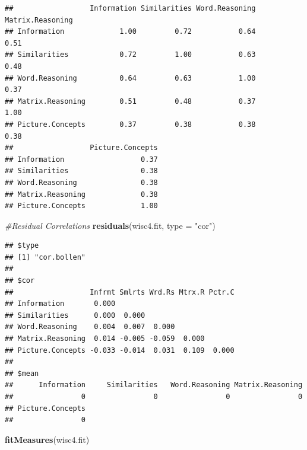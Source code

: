 \documentclass[]{book}
\newenvironment{Shaded}{\begin{snugshade}}{\end{snugshade}}
\newcommand{\KeywordTok}[1]{\textcolor[rgb]{0.13,0.29,0.53}{\textbf{#1}}}
\newcommand{\DataTypeTok}[1]{\textcolor[rgb]{0.13,0.29,0.53}{#1}}
\newcommand{\StringTok}[1]{\textcolor[rgb]{0.31,0.60,0.02}{#1}}
\newcommand{\CommentTok}[1]{\textcolor[rgb]{0.56,0.35,0.01}{\textit{#1}}}
\newcommand{\NormalTok}[1]{#1}
\theoremstyle{definition}
\theoremstyle{definition}
\theoremstyle{definition}
\theoremstyle{remark}
\begin{document}
\begin{verbatim}
##                  Information Similarities Word.Reasoning Matrix.Reasoning
## Information             1.00         0.72           0.64             0.51
## Similarities            0.72         1.00           0.63             0.48
## Word.Reasoning          0.64         0.63           1.00             0.37
## Matrix.Reasoning        0.51         0.48           0.37             1.00
## Picture.Concepts        0.37         0.38           0.38             0.38
##                  Picture.Concepts
## Information                  0.37
## Similarities                 0.38
## Word.Reasoning               0.38
## Matrix.Reasoning             0.38
## Picture.Concepts             1.00
\end{verbatim}

\begin{Shaded}
\begin{Highlighting}[]
\CommentTok{#Residual Correlations }
\KeywordTok{residuals}\NormalTok{(wisc4.fit, }\DataTypeTok{type =} \StringTok{"cor"}\NormalTok{)}
\end{Highlighting}
\end{Shaded}

\begin{verbatim}
## $type
## [1] "cor.bollen"
## 
## $cor
##                  Infrmt Smlrts Wrd.Rs Mtrx.R Pctr.C
## Information       0.000                            
## Similarities      0.000  0.000                     
## Word.Reasoning    0.004  0.007  0.000              
## Matrix.Reasoning  0.014 -0.005 -0.059  0.000       
## Picture.Concepts -0.033 -0.014  0.031  0.109  0.000
## 
## $mean
##      Information     Similarities   Word.Reasoning Matrix.Reasoning 
##                0                0                0                0 
## Picture.Concepts 
##                0
\end{verbatim}

\begin{Shaded}
\begin{Highlighting}[]
\KeywordTok{fitMeasures}\NormalTok{(wisc4.fit)}
\end{Highlighting}
\end{Shaded}
\end{document}
